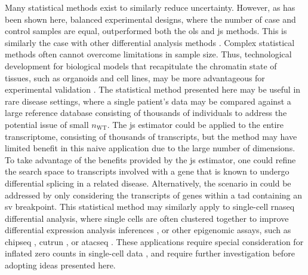 Many statistical methods exist to similarly reduce uncertainty.
However, as has been shown here, balanced experimental designs, where the number of case and control samples are equal, outperformed both the \gls{ols} and \gls{js} methods.
This is similarly the case with other differential analysis methods \cite{schurchHowManyBiological2016,gierlinskiStatisticalModelsRNAseq2015}.
Complex statistical methods often cannot overcome limitations in sample size.
Thus, technological development for biological models that recapitulate the chromatin state of tissues, such as organoids and cell lines, may be more advantageous for experimental validation \cite{zanoniModelingNeoplasticDisease2020}.
The statistical method presented here may be useful in rare disease settings, where a single patient's data may be compared against a large reference database consisting of thousands of individuals to address the potential issue of small $n_\mathrm{WT}$.
The \gls{js} estimator could be applied to the entire transcriptome, consisting of thousands of transcripts, but the method may have limited benefit in this naive application due to the large number of dimensions.
To take advantage of the benefits provided by the \gls{js} estimator, one could refine the search space to transcripts involved with a gene that is known to undergo differential splicing in a related disease.
Alternatively, the scenario in  could be addressed by only considering the transcripts of genes within a \gls{tad} containing an \gls{sv} breakpoint.
This statistical method may similarly apply to single-cell \gls{rnaseq} differential analysis, where single cells are often clustered together to improve differential expression analysis inferences \cite{chenAssessmentComputationalMethods2019}, or other epigenomic assays,  such as \gls{chipseq} \cite{rotemSinglecellChIPseqReveals2015}, \gls{cutrun} \cite{hainerProfilingPluripotencyFactors2019}, or \gls{atacseq} \cite{buenrostroSinglecellChromatinAccessibility2015}.
These applications require special consideration for inflated zero counts in single-cell data \cite{chenAssessmentComputationalMethods2019}, and require further investigation before adopting ideas presented here.
